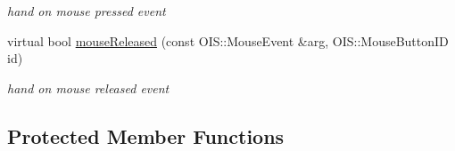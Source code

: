 \begin{DoxyCompactItemize}
\begin{DoxyCompactList}\small\item\em hand on mouse pressed event \end{DoxyCompactList}\item 
\hypertarget{class_stage4_af4fd2715c8e9d9edf39b891a157da9ca}{
virtual bool \hyperlink{class_stage4_af4fd2715c8e9d9edf39b891a157da9ca}{mouseReleased} (const OIS::MouseEvent \&arg, OIS::MouseButtonID id)}
\label{class_stage4_af4fd2715c8e9d9edf39b891a157da9ca}

\begin{DoxyCompactList}\small\item\em hand on mouse released event \end{DoxyCompactList}\end{DoxyCompactItemize}
\subsection*{Protected Member Functions}
